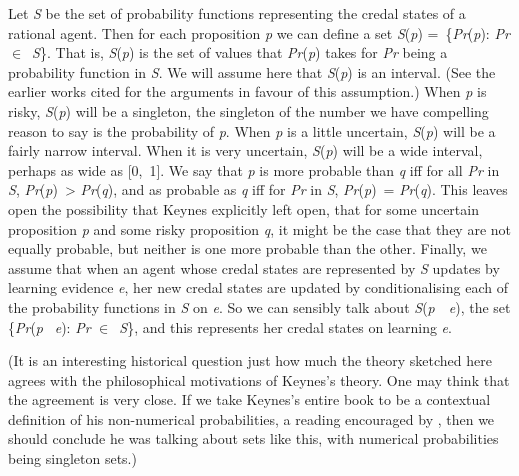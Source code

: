 Let \textit{S} be the set of probability functions representing the credal states of a rational agent. Then for each proposition \textit{p} we can define a set \textit{S}(\textit{p}) =~\{\textit{Pr}(\textit{p}): \textit{Pr} ${\in}$~\textit{S}\}. That is, \textit{S}(\textit{p}) is the set of values that \textit{Pr}(\textit{p}) takes for \textit{Pr} being a probability function in \textit{S}. We will assume here that \textit{S}(\textit{p}) is an interval. (See the earlier works cited for the arguments in favour of this assumption.) When \textit{p} is risky, \textit{S}(\textit{p}) will be a singleton, the singleton of the number we have compelling reason to say is the probability of \textit{p}. When \textit{p} is a little uncertain, \textit{S}(\textit{p}) will be a fairly narrow interval. When it is very uncertain, \textit{S}(\textit{p}) will be a wide interval, perhaps as wide as [0,~1]. We say that \textit{p} is more probable than \textit{q} iff for all \textit{Pr} in \textit{S}, \textit{Pr}(\textit{p})~{\textgreater} \textit{Pr}(\textit{q}), and as probable as \textit{q} iff for \textit{Pr} in \textit{S}, \textit{Pr}(\textit{p})~= \textit{Pr}(\textit{q}). This leaves open the possibility that Keynes explicitly left open, that for some uncertain proposition \textit{p} and some risky proposition \textit{q}, it might be the case that they are not equally probable, but neither is one more probable than the other. Finally, we assume that when an agent whose credal states are represented by \textit{S} updates by learning evidence \textit{e}, her new credal states are updated by conditionalising each of the probability functions in \textit{S} on \textit{e}. So we can sensibly talk about \textit{S}(\textit{p}~{\textbar}~\textit{e}), the set \{\textit{Pr}(\textit{p} {\textbar}~\textit{e}): \textit{Pr} ${\in}$~\textit{S}\}, and this represents her credal states on learning \textit{e}.

(It is an interesting historical question just how much the theory sketched here agrees with the philosophical motivations of Keynes's theory. One may think that the agreement is very close. If we take Keynes's entire book to be a contextual definition of his non\nobreakdash-numerical probabilities, a reading encouraged by \citet{Lewis1970c}, then we should conclude he was talking about sets like this, with numerical probabilities being singleton sets.)

